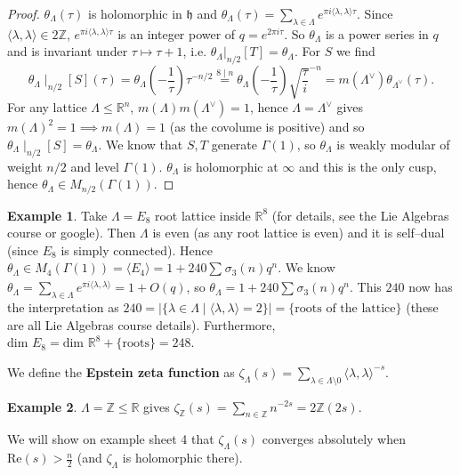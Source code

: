 \documentclass{article}
\theoremstyle{definition}
\newtheorem{example}{Example}[section]
\begin{document}
\begin{proof}
    $\theta_{\Lambda}(\tau)$ is holomorphic in $\mathfrak{h}$ and $\theta_{\Lambda}(\tau) = \sum_{\lambda \in \Lambda}^{} e^{\pi i \langle \lambda, \lambda \rangle \tau}$. Since $\langle \lambda, \lambda \rangle \in 2\mathbb{Z}$, $e^{ \pi i \langle \lambda, \lambda \rangle \tau}$ is an integer power of $q = e^{2\pi i \tau}$. So $\theta_{\Lambda}$ is a power series in $q$ and is invariant under $\tau \mapsto \tau+1$, i.e. $\theta_{\Lambda}|_{n/2}[T] = \theta_\Lambda$. For $S$ we find $$\theta_\Lambda \mid_{n/2}[S](\tau) = \theta_\Lambda \left(-\frac{1}{\tau}\right) \tau^{-n/2} \stackrel{8 \mid n}{=} \theta_\Lambda \left(-\frac{1}{\tau}\right) \sqrt{\frac{\tau}{i}}^{-n} = m(\Lambda^\vee)\theta_{\Lambda^{\vee}}(\tau).$$  
    For any lattice $\Lambda \le \mathbb{R}^n$, $m(\Lambda)m(\Lambda^\vee)=1$, hence $\Lambda = \Lambda^{\vee}$ gives $m(\Lambda)^2=1 \implies m(\Lambda)=1$ (as the covolume is positive) and so $\theta_\Lambda \mid_{n/2}[S]=\theta_\Lambda$. We know that $S, T$ generate $\Gamma(1)$, so $\theta_{\Lambda}$ is weakly modular of weight $n/2$ and level $\Gamma(1)$. $\theta_\Lambda$ is holomorphic at $\infty$ and this is the only cusp, hence $\theta_\Lambda \in M_{n/2}(\Gamma(1))$.
\end{proof}
\begin{example}
    Take $\Lambda = E_8$ root lattice inside $\mathbb{R}^8$ (for details, see the Lie Algebras course or google). Then $\Lambda$ is even (as any root lattice is even) and it is self--dual (since $E_8$ is simply connected). Hence $\theta_\Lambda \in M_{4}(\Gamma(1)) = \langle E_4 \rangle = 1 + 240\sum_{}^{} \sigma_3(n)q^n$. We know $\theta_{\Lambda} = \sum_{\lambda \in \Lambda}^{} e^{\pi i \langle \lambda, \lambda \rangle} = 1 + O(q)$, so $\theta_\Lambda = 1 + 240\sum_{}^{} \sigma_3(n)q^n$. This $240$ now has the interpretation as $240 = |\{\lambda \in \Lambda \mid \langle \lambda, \lambda \rangle = 2\}| = \{\text{roots of the lattice}\}$ (these are all Lie Algebras course details). Furthermore, $\text{dim }E_8 = \text{dim }\mathbb{R}^8 + \{\text{roots}\} = 248$.
\end{example}


We define the \textbf{Epstein zeta function} as $\zeta_{\Lambda}(s) = \sum_{\lambda \in \Lambda\setminus 0}^{} \langle \lambda,\lambda \rangle^{-s}$. 

\begin{example}
    $\Lambda = \mathbb{Z} \le \mathbb{R}$ gives $\zeta_{\mathbb{Z}}(s) = \sum_{n \in \mathbb{Z}}^{} n^{-2s} = 2\mathbb{Z}(2s)$.
\end{example}
We will show on example sheet 4 that $\zeta_\Lambda(s)$ converges absolutely when $\text{Re}(s)>\frac{n}{2}$ (and $\zeta_\Lambda$ is holomorphic there).
\end{document}
